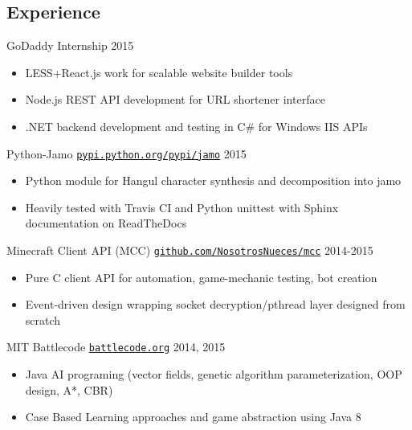 \documentclass[line,margin]{res}
\begin{document}
\begin{resume}
\vspace{-8pt}
\section{Experience} 
\vspace{12pt}
GoDaddy Internship
\hfill  2015
    \begin{itemize} \itemsep -2pt %
    \item LESS+React.js work for scalable website builder tools
    \item Node.js REST API development for URL shortener interface
    \item .NET backend development and testing in C\# for Windows IIS APIs
    \end{itemize}

\vspace{-6pt}
Python-Jamo
\href{https://pypi.python.org/pypi/jamo}{\texttt{pypi.python.org/pypi/jamo}}
\hfill  2015
    \begin{itemize} \itemsep -2pt %
    \item Python module for Hangul character synthesis and decomposition into jamo
    \item Heavily tested with Travis CI and Python unittest with Sphinx documentation on ReadTheDocs
    \end{itemize}

\vspace{-6pt}
Minecraft Client API (MCC)
\href{https://www.github.com/NosotrosNueces/mcc}{\texttt{github.com/NosotrosNueces/mcc}}
\hfill  2014-2015
    \begin{itemize} \itemsep -2pt %
    \item Pure C client API for automation, game-mechanic testing, bot creation
    \item Event-driven design wrapping socket decryption/pthread layer designed from scratch
    \end{itemize}

\vspace{-6pt}
MIT Battlecode \href{http://www.battlecode.org/}{\texttt{battlecode.org}}
\hfill  2014, 2015
    \begin{itemize} \itemsep -2pt %
    \item Java AI programing (vector fields, genetic algorithm parameterization, OOP design, A*, CBR)
    \item Case Based Learning approaches and game abstraction using Java 8
    \end{itemize}


\end{resume}
\end{document}
